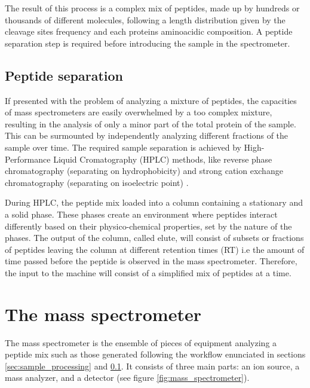 \documentclass[11pt, a4paper]{report}
\begin{document}
The result of this process is a complex mix of peptides, made up by hundreds or thousands of different molecules, following a length distribution given by the cleavage sites frequency and each protein\textquotesingle s aminoacidic composition. A peptide separation step is required before introducing the sample in the spectrometer.

\subsection{Peptide separation}
\label{subsec:peptide_separation}

If presented with the problem of analyzing a mixture of peptides, the capacities of mass spectrometers are easily overwhelmed by a too complex mixture, resulting in the analysis of only a minor part of the total protein of the sample. This can be surmounted by independently analyzing different fractions of the sample over time. The required sample separation is achieved by High-Performance Liquid Cromatography (\ac{HPLC}) methods, like reverse phase chromatography (separating on hydrophobicity) and strong cation exchange chromatography (separating on isoelectric point) \cite{Barsnes2008}.

During \ac{HPLC}, the peptide mix loaded into a column containing a stationary and a solid phase. These phases create an environment where peptides interact differently based on their physico-chemical properties, set by the nature of the phases. The output of the column, called elute, will consist of subsets or fractions of peptides leaving the column at different retention times (\ac{RT}) i.e the amount of time passed before the peptide is observed in the mass spectrometer. Therefore, the input to the machine will consist of a simplified mix of peptides at a time.

\section{The mass spectrometer}
\label{sec:the_mass_spectrometer}

The mass spectrometer is the ensemble of pieces of equipment analyzing a peptide mix such as those generated following the workflow enunciated in sections \ref{sec:sample_processing} and \ref{subsec:peptide_separation}. It consists of three main parts: an ion source, a mass analyzer, and a detector (see figure \ref{fig:mass_spectrometer}).
\end{document}
